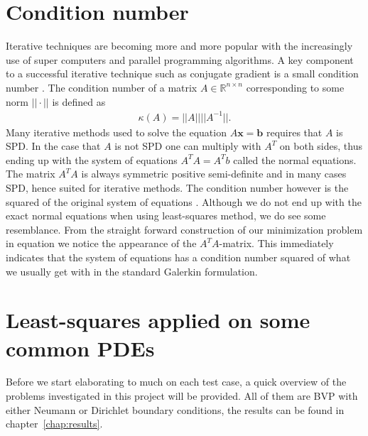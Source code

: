 \section{Condition number} \label{condNum}
Iterative techniques are becoming more and more popular with the increasingly use of super computers and parallel programming algorithms. A key component to a successful iterative technique such as conjugate gradient is a small condition number \cite{Saad}. The condition number of a matrix $A \in \mathbb{R}^{n\times n}$ corresponding to some norm $||\cdot||$ is defined as 
\begin{align}
	\kappa(A) = ||A||||A^{-1}||.
\end{align}
Many iterative methods used to solve the equation $A\mathbf{x}=\mathbf{b}$ requires that $A$ is SPD. In the case that $A$ is not SPD one can multiply with $A^T$ on both sides, thus ending up with the system of equations $A^TA = A^Tb$ called the normal equations. The matrix $A^TA$ is always symmetric positive semi-definite and in many cases SPD, hence suited for iterative methods. The condition number however is the squared of the original system of equations \cite{DM}. Although we do not end up with the exact normal equations when using least-squares method, we do see some resemblance. From the straight forward construction of our minimization problem in equation we notice the appearance of the $A^TA$-matrix. This immediately indicates that the system of equations has a condition number squared of what we usually get with in the standard Galerkin formulation. 
%
%
\section{Least-squares applied on some common PDEs}
Before we start elaborating to much on each test case, a quick overview of the problems investigated in this project will be provided. All of them are BVP with either Neumann or Dirichlet boundary conditions, the results can be found in chapter~\ref{chap:results}. 

